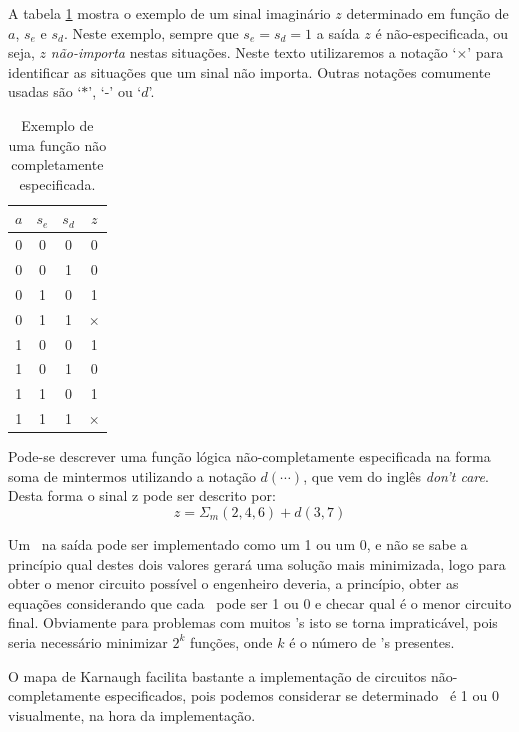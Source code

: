 A tabela \ref{tab:verdade_nce} mostra o exemplo de um sinal imaginário $z$ determinado em função de $a$, $s_e$ e $s_d$. Neste exemplo, sempre que $s_e=s_d=1$ a saída $z$ é não-especificada, ou seja, $z$ \emph{não-importa} nestas situações. Neste texto utilizaremos a notação `$\times$' para identificar as situações que um sinal não importa. Outras notações comumente usadas são `$\ast$', `-' ou `$d$'.

\begin{table}[!h]
  \centering
  \caption{Exemplo de uma função não completamente especificada.}
  \label{tab:verdade_nce}
    \begin{tabular}{|c|c|c||c|}
\hline
$a$ & $s_e$ & $s_d$ & $z$ \\
\hline\hline
0 & 0 & 0 & 0 \\

0 & 0 & 1 & 0 \\

0 & 1 & 0 & 1 \\

0 & 1 & 1 & $\times$ \\
\hline
1 & 0 & 0 & 1 \\

1 & 0 & 1 & 0 \\

1 & 1 & 0 & 1 \\

1 & 1 & 1 & $\times$ \\
\hline
\end{tabular}
\end{table}

Pode-se descrever uma função lógica não-completamente especificada na forma soma de mintermos utilizando a notação $d(\cdots)$, que vem do inglês \emph{don't care}. Desta forma o sinal z pode ser descrito por:
\begin{equation}
  \label{eq:z}
  z = \Sigma_m(2,4,6)+d(3,7)
\end{equation}

Um \dontcare~na saída pode ser implementado como um 1 ou um 0, e não se sabe a princípio qual destes dois valores gerará uma solução mais minimizada, logo para obter o menor circuito possível o engenheiro deveria, a princípio, obter as equações considerando que cada \dontcare~pode ser 1 ou 0 e checar qual é o menor circuito final. Obviamente para problemas com muitos \dontcare's isto se torna impraticável, pois seria necessário minimizar $2^k$ funções, onde $k$ é o número de \dontcare's presentes.

O mapa de Karnaugh facilita bastante a implementação de circuitos não-completamente especificados, pois podemos considerar se determinado \dontcare~é 1 ou 0 visualmente, na hora da implementação.


